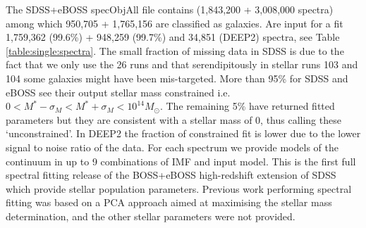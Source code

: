 \documentclass[onecolumn]{aa}
\begin{document}
The SDSS+eBOSS specObjAll file contains (1,843,200 + 3,008,000 spectra) among which 950,705 + 1,765,156 are classified as galaxies. Are input for a fit 1,759,362 (99.6\%) + 948,259 (99.7\%) and 34,851 (DEEP2) spectra, see Table \ref{table:single:spectra}. The small fraction of missing data in SDSS is due to the fact that we only use the 26 runs and that serendipitously in stellar runs 103 and 104 some galaxies might have been mis-targeted. More than 95\% for SDSS and eBOSS see their output stellar mass constrained i.e. $0<M^*-\sigma_M<M^*+\sigma_M<10^{14} M_\odot$. The remaining 5\% have returned fitted parameters but they are consistent with a stellar mass of 0, thus calling these `unconstrained'. In DEEP2 the fraction of constrained fit is lower due to the lower signal to noise ratio of the data.
For each spectrum we provide models of the continuum in up to 9 combinations of IMF and input model. 
This is the first full spectral fitting release of the BOSS+eBOSS high-redshift extension of SDSS which provide stellar population parameters. 
Previous work performing spectral fitting was based on a PCA approach \citep{2012MNRAS.421..314C} aimed at maximising the stellar mass determination, and the other stellar parameters were not provided.
\end{document}
